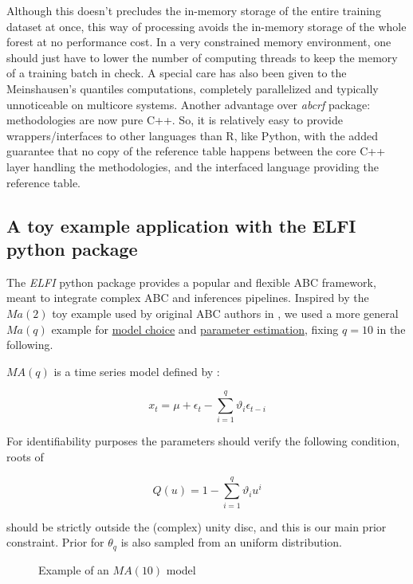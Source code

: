 \documentclass[long, final]{jobim}
\begin{document}
Although this doesn't precludes the in-memory storage of the entire training dataset at once, this way of processing avoids the in-memory storage of the whole forest at no performance cost. In a very constrained memory environment, one should just have to lower the number of computing threads to keep the memory of a training batch in check. A special care has also been given to the Meinshausen's quantiles computations, completely parallelized and typically unnoticeable on multicore systems. Another advantage over \emph{abcrf} package: methodologies are now pure C++. So, it is relatively easy to provide wrappers/interfaces to other languages than R, like Python, with the added guarantee that no copy of the reference table happens between the core C++ layer handling the methodologies, and the interfaced language providing the reference table.

\subsection{A toy example application with the ELFI python package}

The \emph{ELFI} python package \cite{lintusaari2018elfi} provides a popular and flexible ABC framework, meant to integrate complex ABC and inferences pipelines. Inspired by the $Ma(2)$ toy example used by original ABC authors in \cite{marin2012approximate}, we used a more general $Ma(q)$ example for \href{https://github.com/diyabc/abcranger/blob/master/testpy/Model%20Choice%20Demo.ipynb}{model choice} and \href{https://github.com/diyabc/abcranger/blob/master/testpy/Parameter%20Estimation%20Demo.ipynb}{parameter estimation}, fixing $q=10$ in the following.

$MA(q)$ is a time series model defined by :

$$ x_{t}=\mu+\epsilon_{t}-\sum_{i=1}^{q} \vartheta_{i} \epsilon_{t-i} $$

For identifiability purposes the parameters should verify the following condition, roots of 

$$ Q(u)=1-\sum_{i=1}^{q} \vartheta_{i} u^{i} $$

should be strictly outside the (complex) unity disc, and this is our main prior constraint. Prior for $\theta_q$ is also sampled from an uniform distribution.

\begin{figure}
  \begin{center}
    \setlength{\unitlength}{5mm}
    
  \end{center}
  \caption{Example of an $MA(10)$ model}
  \label{fig:signal}
\end{figure}
\end{document}
